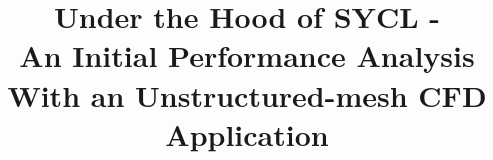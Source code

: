 \documentclass[runningheads]{llncs}
\begin{document}
%
\title{Under the Hood of SYCL - \\An Initial Performance Analysis With 
an Unstructured-mesh CFD Application}




\end{document}
